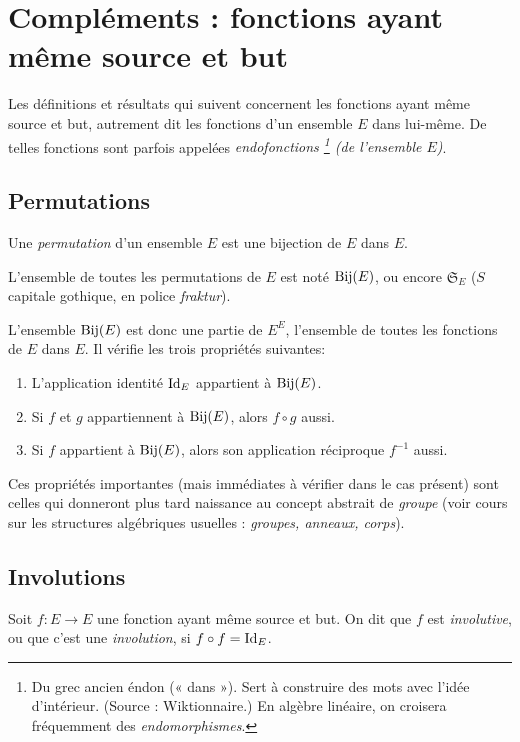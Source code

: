 \section{Compléments : fonctions ayant même source et but}



Les définitions et résultats qui suivent concernent les fonctions ayant même source et but, autrement dit les fonctions d'un ensemble $E$ dans lui-même. De telles fonctions sont parfois appelées \emph{endofonctions
\footnote{Du grec ancien éndon (« dans »). Sert à construire des mots avec l’idée d’intérieur. (Source : Wiktionnaire.) En algèbre linéaire, on croisera fréquemment des \emph{endomorphismes}.}
 (de l'ensemble $E$)}.


\subsection{Permutations}

\begin{definition}
Une \emph{permutation} d'un ensemble $E$ est une bijection de $E$ dans $E$. 
\end{definition}

L'ensemble de toutes les permutations de $E$ est noté $\operatorname{Bij}(E)$, ou encore $\mathfrak S_E$ ($S$ capitale gothique, en police \emph{fraktur}).

L'ensemble $\operatorname{Bij}(E)$ est donc une partie de $E^E$, l'ensemble de toutes les fonctions de $E$ dans $E$. Il vérifie les trois propriétés suivantes:
\begin{enumerate}
\item L'application identité $\operatorname{Id}_E$ appartient à $\operatorname{Bij}(E)$.
\item Si $f$ et $g$ appartiennent à $\operatorname{Bij}(E)$, alors $f\circ g$ aussi.
\item Si $f$ appartient à $\operatorname{Bij}(E)$, alors son application réciproque $f^{-1}$ aussi.
\end{enumerate}
Ces propriétés importantes (mais immédiates à vérifier dans le cas présent) sont celles qui donneront plus tard naissance au concept abstrait de \emph{groupe} (voir cours sur les structures algébriques usuelles : \emph{groupes, anneaux, corps}).


\subsection{Involutions}
\begin{definition}
Soit $f : E\to E$ une fonction ayant même source et but. On dit que $f$ est \emph{involutive}, ou que c'est une \emph{involution}, si $f\circ f=\operatorname{Id}_E$.
\end{definition}

